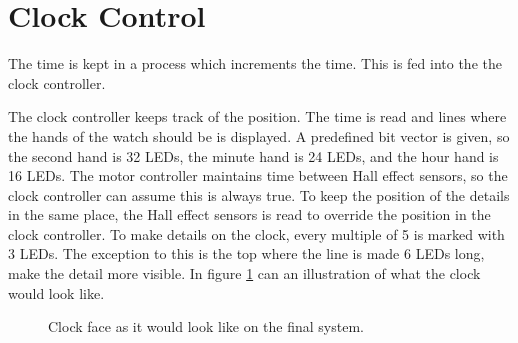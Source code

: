 \section{Clock Control}
The time is kept in a process which increments the time.
This is fed into the the clock controller.

The clock controller keeps track of the position.
The time is read and lines where the hands of the watch should be is displayed.
A predefined bit vector is given, so the second hand is 32 LEDs, the minute hand is 24 LEDs, and the hour hand is 16 LEDs.
The motor controller maintains time between Hall effect sensors, so the clock controller can assume this is always true.
To keep the position of the details in the same place, the Hall effect sensors is read to override the position in the clock controller.
To make details on the clock, every multiple of 5 is marked with 3 LEDs.
The exception to this is the top where the line is made 6 LEDs long, make the detail more visible.
In figure \ref{fig:clock_face} can an illustration of what the clock would look like.

\begin{figure}[h]
\centering
{}
 \caption{Clock face as it would look like on the final system.}
 \label{fig:clock_face}
\end{figure}